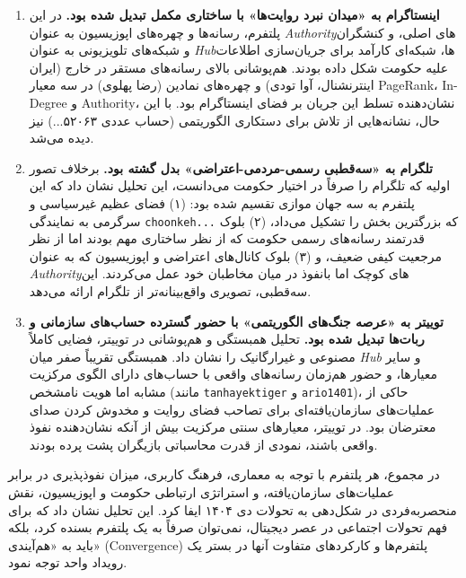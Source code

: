 \documentclass{article}
\begin{document}
	\begin{enumerate}
		\item \textbf{اینستاگرام به «میدان نبرد روایت‌ها» با ساختاری مکمل تبدیل شده بود.} در این پلتفرم، رسانه‌ها و چهره‌های اپوزیسیون به عنوان \textit{Authority}های اصلی، و کنشگران و شبکه‌های تلویزیونی به عنوان \textit{Hub}ها، شبکه‌ای کارآمد برای جریان‌سازی اطلاعات علیه حکومت شکل داده بودند. هم‌پوشانی بالای رسانه‌های مستقر در خارج (ایران اینترنشنال، آوا تودی) و چهره‌های نمادین (رضا پهلوی) در سه معیار PageRank، In-Degree و Authority، نشان‌دهنده تسلط این جریان بر فضای اینستاگرام بود. با این حال، نشانه‌هایی از تلاش برای دستکاری الگوریتمی (حساب عددی ۵۲۰۶۳...) نیز دیده می‌شد.
		
		\item \textbf{تلگرام به «سه‌قطبی رسمی-مردمی-اعتراضی» بدل گشته بود.} برخلاف تصور اولیه که تلگرام را صرفاً در اختیار حکومت می‌دانست، این تحلیل نشان داد که این پلتفرم به سه جهان موازی تقسیم شده بود: (۱) فضای عظیم غیرسیاسی و سرگرمی به نمایندگی \texttt{choonkeh...} که بزرگترین بخش را تشکیل می‌داد، (۲) بلوک قدرتمند رسانه‌های رسمی حکومت که از نظر ساختاری مهم بودند اما از نظر مرجعیت کیفی ضعیف، و (۳) بلوک کانال‌های اعتراضی و اپوزیسیون که به عنوان \textit{Authority}های کوچک اما بانفوذ در میان مخاطبان خود عمل می‌کردند. این سه‌قطبی، تصویری واقع‌بینانه‌تر از تلگرام ارائه می‌دهد.
		
		\item \textbf{توییتر به «عرصه جنگ‌های الگوریتمی» با حضور گسترده حساب‌های سازمانی و ربات‌ها تبدیل شده بود.} تحلیل همبستگی و هم‌پوشانی در توییتر، فضایی کاملاً مصنوعی و غیرارگانیک را نشان داد. همبستگی تقریباً صفر میان \textit{Hub} و سایر معیارها، و حضور هم‌زمان رسانه‌های واقعی با حساب‌های دارای الگوی مرکزیت مشابه اما هویت نامشخص (مانند \texttt{tanhayektiger} و \texttt{ario1401})، حاکی از عملیات‌های سازمان‌یافته‌ای برای تصاحب فضای روایت و مخدوش کردن صدای معترضان بود. در توییتر، معیارهای سنتی مرکزیت بیش از آنکه نشان‌دهنده نفوذ واقعی باشند، نمودی از قدرت محاسباتی بازیگران پشت پرده بودند.
	\end{enumerate}
	
	در مجموع، هر پلتفرم با توجه به معماری، فرهنگ کاربری، میزان نفوذپذیری در برابر عملیات‌های سازمان‌یافته، و استراتژی ارتباطی حکومت و اپوزیسیون، نقش منحصربه‌فردی در شکل‌دهی به تحولات دی ۱۴۰۴ ایفا کرد. این تحلیل نشان داد که برای فهم تحولات اجتماعی در عصر دیجیتال، نمی‌توان صرفاً به یک پلتفرم بسنده کرد، بلکه باید به «هم‌آیندی» (Convergence) پلتفرم‌ها و کارکردهای متفاوت آنها در بستر یک رویداد واحد توجه نمود.
	


\FloatBarrier
\end{document}
